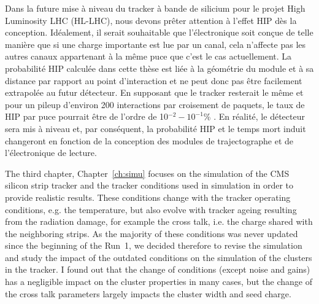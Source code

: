Dans la future mise à niveau du tracker à bande de silicium pour le projet High Luminosity LHC (HL-LHC), nous devons prêter attention à l’effet HIP dès la conception. Idéalement, il serait souhaitable que l’électronique soit conçue de telle manière que si une charge importante est lue par un canal, cela n’affecte pas les autres canaux appartenant à la même puce que c’est le cas actuellement. La probabilité HIP calculée dans cette thèse est liée à la géométrie du module et à sa distance par rapport au point d'interaction et ne peut donc pas être facilement extrapolée au futur détecteur. En supposant que le tracker resterait le même et pour un pileup d'environ 200 interactions par croisement de paquets, le taux de HIP par puce pourrait être de l'ordre de 10$^{-2}-10 ^{-1}$\% . En réalité, le détecteur sera mis à niveau et, par conséquent, la probabilité HIP et le temps mort induit changeront en fonction de la conception des modules de trajectographe et de l’électronique de lecture.

\vspace*{1cm}



The third chapter, Chapter~\ref{ch:simu} focuses on the  simulation of the CMS silicon strip tracker and the tracker conditions used in simulation in order to provide realistic results. These conditions change with the tracker operating conditions, e.g. the temperature, but also evolve with tracker ageing resulting from the radiation damage, for example the cross talk, i.e. the charge shared with the neighboring strips. As the majority of these conditions was never updated since the beginning of the Run~1, we decided therefore to revise the simulation and study the impact of the outdated conditions on the simulation of the clusters in the tracker. I found out that the change of conditions (except noise and gains) has a negligible impact on the cluster properties in many cases, but the change of the cross talk parameters largely impacts the cluster width and seed charge.

